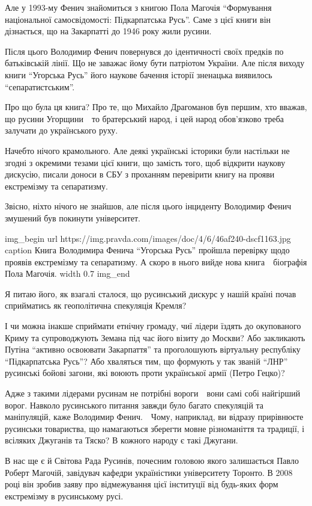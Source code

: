 Але у 1993-му Фенич знайомиться з книгою Пола Магочія \enquote{Формування національної
самосвідомості: Підкарпатська Русь}. Саме з цієї книги він дізнається, що на
Закарпатті до 1946 року жили русини.

Після цього Володимир Фенич повернувся до ідентичності своїх предків по
батьківській лінії. Що не заважає йому бути патріотом України. Але після виходу
книги \enquote{Угорська Русь} його наукове бачення історії зненацька виявилось
\enquote{сепаратистським}.

Про що була ця книга? Про те, що Михайло Драгоманов був першим, хто вважав, що
русини Угорщини\ \textemdash\ то братерський народ, і цей народ обов’язково треба залучати
до українського руху.

Начебто нічого крамольного. Але деякі українські історики були настільки не
згодні з окремими тезами цієї книги, що замість того, щоб відкрити наукову
дискусію, писали доноси в СБУ з проханням перевірити книгу на прояви
екстремізму та сепаратизму.

Звісно, ніхто нічого не знайшов, але після цього інциденту Володимир Фенич
змушений був покинути університет.

\ifcmt
img_begin 
	url https://img.pravda.com/images/doc/4/6/46af240-dscf1163.jpg
	caption Книга Володимира Фенича \enquote{Угорська Русь} пройшла перевірку щодо проявів екстремізму та сепаратизму. А скоро в нього вийде нова книга\ \textemdash\ біографія Пола Магочія.
    width 0.7
img_end
\fi

Я питаю його, як взагалі сталося, що русинський дискурс у нашій країні почав
сприйматись як геополітична спекуляція Кремля?

І чи можна інакше сприймати етнічну громаду, чиї лідери їздять до окупованого
Криму та супроводжують Земана під час його візиту до Москви? Або закликають
Путіна \enquote{активно освоювати Закарпаття} та проголошують віртуальну республіку
\enquote{Підкарпатська Русь}? Або хваляться тим, що формують у так званій \enquote{ЛНР}
русинські бойові загони, які воюють проти української армії (Петро Гецко)?

Адже з такими лідерами русинам не потрібні вороги\ \textemdash\ вони самі собі найгірший
ворог. \dshM Навколо русинського питання завжди було багато спекуляцій та маніпуляцій, \dshM каже Володимир Фенич.\ \textemdash\ Чому, наприклад, ви відразу прирівнюєте русинськи
товариства, що намагаються зберегти мовне різноманіття та традиції, і всіляких
Джуганів та Тяско? В кожного народу є такі Джугани.

В нас ще є й Світова Рада Русинів, почесним головою якого залишається Павло
Роберт Магочій, завідувач кафедри україністики університету Торонто. В 2008
році він зробив заяву про відмежування цієї інституції від будь-яких форм
екстремізму в русинському русі.

